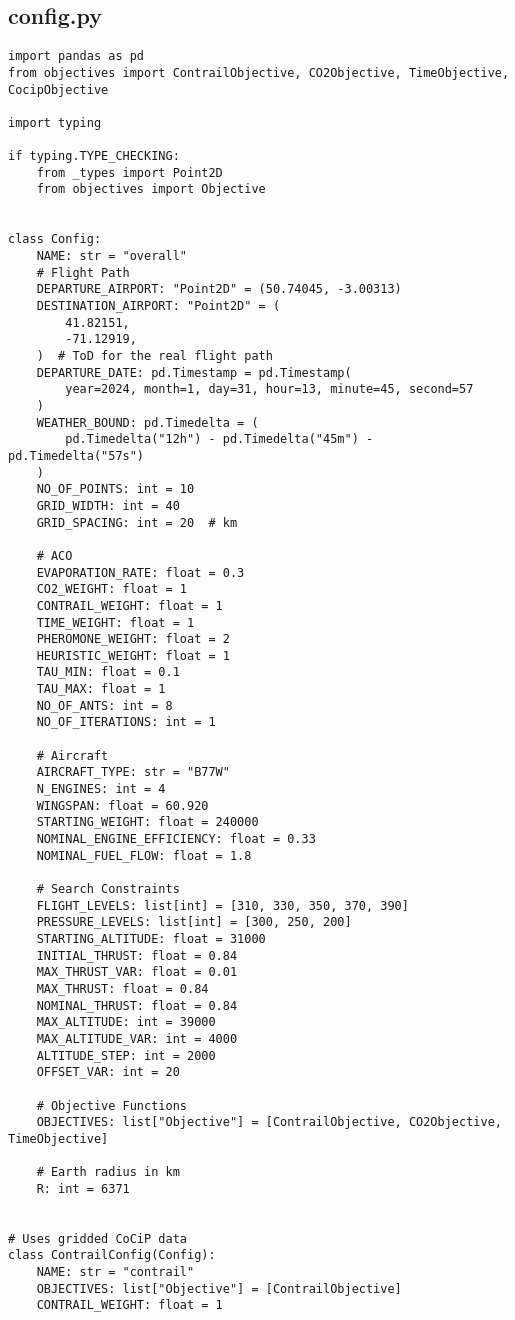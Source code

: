 \subsection{config.py}
\begin{verbatim}
import pandas as pd
from objectives import ContrailObjective, CO2Objective, TimeObjective, CocipObjective

import typing

if typing.TYPE_CHECKING:
    from _types import Point2D
    from objectives import Objective


class Config:
    NAME: str = "overall"
    # Flight Path
    DEPARTURE_AIRPORT: "Point2D" = (50.74045, -3.00313)
    DESTINATION_AIRPORT: "Point2D" = (
        41.82151,
        -71.12919,
    )  # ToD for the real flight path
    DEPARTURE_DATE: pd.Timestamp = pd.Timestamp(
        year=2024, month=1, day=31, hour=13, minute=45, second=57
    )
    WEATHER_BOUND: pd.Timedelta = (
        pd.Timedelta("12h") - pd.Timedelta("45m") - pd.Timedelta("57s")
    )
    NO_OF_POINTS: int = 10
    GRID_WIDTH: int = 40
    GRID_SPACING: int = 20  # km

    # ACO
    EVAPORATION_RATE: float = 0.3
    CO2_WEIGHT: float = 1
    CONTRAIL_WEIGHT: float = 1
    TIME_WEIGHT: float = 1
    PHEROMONE_WEIGHT: float = 2
    HEURISTIC_WEIGHT: float = 1
    TAU_MIN: float = 0.1
    TAU_MAX: float = 1
    NO_OF_ANTS: int = 8
    NO_OF_ITERATIONS: int = 1

    # Aircraft
    AIRCRAFT_TYPE: str = "B77W"
    N_ENGINES: int = 4
    WINGSPAN: float = 60.920
    STARTING_WEIGHT: float = 240000
    NOMINAL_ENGINE_EFFICIENCY: float = 0.33
    NOMINAL_FUEL_FLOW: float = 1.8

    # Search Constraints
    FLIGHT_LEVELS: list[int] = [310, 330, 350, 370, 390]
    PRESSURE_LEVELS: list[int] = [300, 250, 200]
    STARTING_ALTITUDE: float = 31000
    INITIAL_THRUST: float = 0.84
    MAX_THRUST_VAR: float = 0.01
    MAX_THRUST: float = 0.84
    NOMINAL_THRUST: float = 0.84
    MAX_ALTITUDE: int = 39000
    MAX_ALTITUDE_VAR: int = 4000
    ALTITUDE_STEP: int = 2000
    OFFSET_VAR: int = 20

    # Objective Functions
    OBJECTIVES: list["Objective"] = [ContrailObjective, CO2Objective, TimeObjective]

    # Earth radius in km
    R: int = 6371


# Uses gridded CoCiP data
class ContrailConfig(Config):
    NAME: str = "contrail"
    OBJECTIVES: list["Objective"] = [ContrailObjective]
    CONTRAIL_WEIGHT: float = 1



\end{verbatim}
